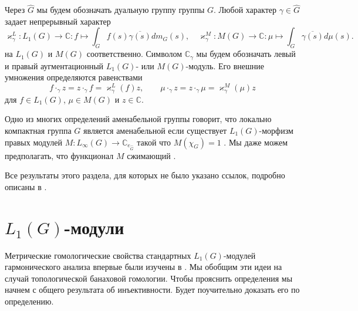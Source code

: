 \documentclass{article}
\numberwithin{equation}{section}
\theoremstyle{plain}
\theoremstyle{definition}
\begin{document}
\begin{fulltext}
Через $\widehat{G}$ мы будем обозначать дуальную группу группы $G$. Любой характер 
$\gamma\in\widehat{G}$ задает непрерывный характер  
\[
\varkappa_\gamma^L:L_1(G)\to\mathbb{C}:f\mapsto \int_G f(s)\overline{\gamma(s)}d m_G(s),
\quad
\varkappa_\gamma^M:M(G)\to\mathbb{C}:\mu\mapsto\int_{G} \overline{\gamma(s)}d\mu(s).
\]
на $L_1(G)$ и $M(G)$ соответственно. Символом $\mathbb{C}_\gamma$ мы будем обозначать 
левый и правый аугментационный $L_1(G)$- или $M(G)$-модуль. Его внешние умножения 
определяются равенствами
\[
f\cdot_{\gamma}z=z\cdot_{\gamma}f=\varkappa_\gamma^L(f)z,
\qquad
\mu\cdot_{\gamma}z=z\cdot_{\gamma}\mu=\varkappa_\gamma^M(\mu)z
\]
для $f\in L_1(G)$, $\mu\in M(G)$ и $z\in\mathbb{C}$. 

Одно из многих определений аменабельной группы говорит, что локально компактная 
группа $G$ является аменабельной если существует $L_1(G)$-морфизм правых модулей $M:L_\infty(G)\to\mathbb{C}_{e_{\widehat{G}}}$ такой что $M(\chi_G)=1$ 
\cite[раздел~VII.2.5]{HelBanLocConvAlg}. Мы даже можем предполагать, что 
функционал $M$ сжимающий \cite[замечание~VII.1.54]{HelBanLocConvAlg}.

Все результаты этого раздела, для которых не было указано ссылок, подробно 
описаны в \cite[раздел~3.3]{DalBanAlgAutCont}.


\section{\texorpdfstring{$L_1(G)$}{L1(G)}-модули}
\label{SubSectionL1GModules}

Метрические гомологические свойства стандартных $L_1(G)$-модулей гармонического 
анализа впервые были изучены в \cite{GravInjProjBanMod}. Мы обобщим эти идеи на 
случай топологической банаховой гомологии. Чтобы прояснить определения мы начнем 
с общего результата об инъективности. Будет поучительно доказать его по определению.


\end{fulltext}
\end{document}
